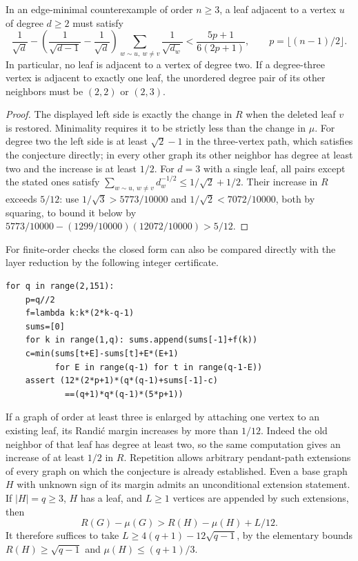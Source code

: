 \documentclass[11pt,a4paper]{article}
\begin{document}
\begin{corollary}\label{p08-cor:leafsupport}
In an edge-minimal counterexample of order $n\ge3$, a leaf adjacent
to a vertex $u$ of degree $d\ge2$ must satisfy
\[
 \frac1{\sqrt d}
 -\left(\frac1{\sqrt{d-1}}-\frac1{\sqrt d}\right)
      \sum_{w\sim u,\ w\ne v} \frac1{\sqrt {d_w}}
 < \frac{5p+1}{6(2p+1)},\qquad p=\lfloor(n-1)/2\rfloor .
\]
In particular, no leaf is adjacent to a vertex of degree two.
If a degree-three vertex is adjacent to exactly one leaf, the
unordered degree pair of its other neighbors must be $(2,2)$ or
$(2,3)$.
\end{corollary}
\begin{proof}
The displayed left side is exactly the change in $R$ when the deleted
leaf $v$ is restored. Minimality requires it to be strictly less than
the change in $\mu$. For degree two the left side is at least
$\sqrt2-1$ in the three-vertex path, which satisfies the conjecture
directly; in every other graph its other neighbor has degree at least
two and the increase is at least $1/2$. For $d=3$ with a single leaf,
all pairs except the stated ones satisfy
$\sum_{w\sim u,\,w\ne v}d_w^{-1/2}\le 1/\sqrt2+1/2$.
Their increase in $R$ exceeds $5/12$: use
$1/\sqrt3>5773/10000$ and $1/\sqrt2<7072/10000$, both by squaring,
to bound it below by
$5773/10000-(1299/10000)(12072/10000)>5/12$.
\end{proof}
For finite-order checks the closed form can also be compared directly
with the layer reduction by the following integer certificate.
\begin{verbatim}
for q in range(2,151):
    p=q//2
    f=lambda k:k*(2*k-q-1)
    sums=[0]
    for k in range(1,q): sums.append(sums[-1]+f(k))
    c=min(sums[t+E]-sums[t]+E*(E+1)
          for E in range(q-1) for t in range(q-1-E))
    assert (12*(2*p+1)*(q*(q-1)+sums[-1]-c)
            ==(q+1)*q*(q-1)*(5*p+1))
\end{verbatim}
If a graph of order at least three is enlarged by attaching one vertex
to an existing leaf, its Randi\'c margin increases by more than $1/12$.
Indeed the old neighbor of that leaf has degree at least two, so the
same computation gives an increase of at least $1/2$ in $R$. Repetition
allows arbitrary pendant-path extensions of every graph on which the
conjecture is already established.
Even a base graph $H$ with unknown sign of its margin admits an
unconditional extension statement. If $|H|=q\ge3$, $H$ has a leaf, and
$L\ge1$ vertices are appended by such extensions, then
\[
 R(G)-\mu(G)>R(H)-\mu(H)+L/12.
\]
It therefore suffices to take
$L\ge4(q+1)-12\sqrt{q-1}$, by the elementary bounds
$R(H)\ge\sqrt{q-1}$ and $\mu(H)\le(q+1)/3$.
\end{document}
